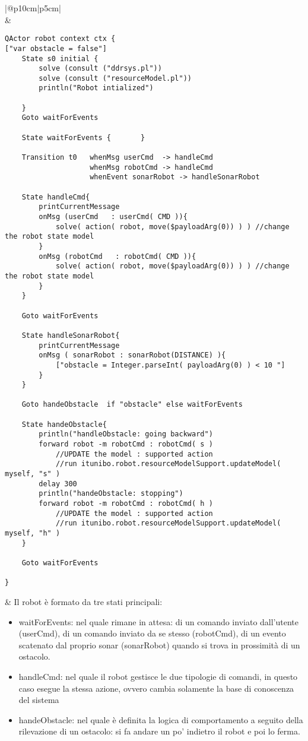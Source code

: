\begin{tabular}{|@{}p{10cm}|p{5cm}|}
\hline\\
  &   \\
\begin{lstlisting}[backgroundcolor=\color{white}]
QActor robot context ctx { 
["var obstacle = false"]
	State s0 initial {
		solve (consult ("ddrsys.pl")) 
		solve (consult ("resourceModel.pl")) 
		println("Robot intialized")
		
	} 
	Goto waitForEvents
	  
	State waitForEvents {		} 
	
	Transition t0   whenMsg userCmd  -> handleCmd
					whenMsg robotCmd -> handleCmd
					whenEvent sonarRobot -> handleSonarRobot
 	 
	State handleCmd{  
		printCurrentMessage
		onMsg (userCmd   : userCmd( CMD )){
			solve( action( robot, move($payloadArg(0)) ) ) //change the robot state model
		}
		onMsg (robotCmd   : robotCmd( CMD )){
			solve( action( robot, move($payloadArg(0)) ) ) //change the robot state model
		}
	}
	
	Goto waitForEvents
	
	State handleSonarRobot{
 		printCurrentMessage
 		onMsg ( sonarRobot : sonarRobot(DISTANCE) ){
			["obstacle = Integer.parseInt( payloadArg(0) ) < 10 "]
 		} 	 
 	}
 	
	Goto handeObstacle  if "obstacle" else waitForEvents 
	
	State handeObstacle{		
		println("handleObstacle: going backward")  
 		forward robot -m robotCmd : robotCmd( s ) 		
 			//UPDATE the model : supported action
 			//run itunibo.robot.resourceModelSupport.updateModel( myself, "s" )
 		delay 300
 		println("handeObstacle: stopping")  
	    forward robot -m robotCmd : robotCmd( h )
 			//UPDATE the model : supported action
 			//run itunibo.robot.resourceModelSupport.updateModel( myself, "h" )
  	}
  	
	Goto waitForEvents

} 

\end{lstlisting} &  \vspace{0.5ex} Il robot è formato da tre stati principali:
\begin{itemize}
    \item waitForEvents: nel quale rimane in attesa: di un comando inviato dall'utente (userCmd), di un comando inviato da se stesso (robotCmd), di un evento scatenato dal proprio sonar (sonarRobot) quando si trova in prossimità di un ostacolo.
    \item handleCmd: nel quale il robot gestisce le due tipologie di comandi, in questo caso esegue la stessa azione, ovvero cambia solamente la base di conoscenza del sistema
    \item handeObstacle: nel quale è definita la logica di comportamento a seguito della rilevazione di un ostacolo: si fa andare un po' indietro il robot e poi lo ferma.
\end{itemize}\\

\hline

\end{tabular}



